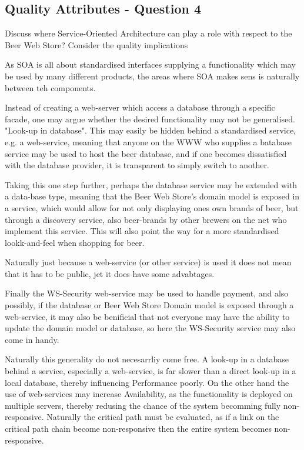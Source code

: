 \subsection{Quality Attributes - Question 4}

\begin{question}
Discuss where Service-Oriented Architecture can play a role
with respect to the Beer Web Store? Consider the quality implications
\end{question}

As SOA is all about standardised interfaces supplying a functionality which may be used by many different products, the areas where SOA makes sens is naturally between teh components. 

Instead of creating a web-server which access a database through a specific facade, one may argue whether the desired functionality may not be generalised. "Look-up in database". This may easily be hidden behind a standardised service, e.g. a web-service, meaning that anyone on the WWW who supplies a batabase service may be used to host the beer database, and if one becomes dissatisfied with the database provider, it is transparent to simply switch to another. 

Taking this one step further, perhaps the database service may be extended with a data-base type, meaning that the Beer Web Store's domain model is exposed in a service, which would allow for not only displaying ones own brands of beer, but through a discovery service, also beer-brands by other brewers on the net who implement this service. This will also point the way for a more standardised lookk-and-feel when shopping for beer.

Naturally just because a web-service (or other service) is used it does not mean that it has to be public, jet it does have some advabtages.

Finally the WS-Security web-service may be used to handle payment, and also possibly, if the database or Beer Web Store Domain model is exposed through a web-service, it may also be benificial that not everyone may have the ability to update the domain model or database, so here the WS-Security service may also come in handy.

Naturally this generality do not necesarrliy come free. A look-up in a database behind a service, especially a web-service, is far slower than a direct look-up in a local database, thereby influencing Performance poorly. On the other hand the use of web-services may increase Availability, as the functionality is deployed on multiple servers, thereby redusing the chance of the system becomming fully non-responsive. Naturally the critical path must be evaluated, as if a link on the critical path chain become non-responsive then the entire system becomes non-responsive.

